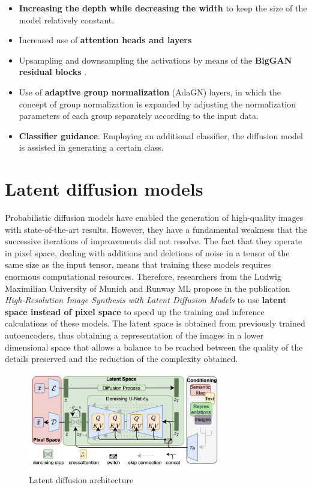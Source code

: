 \begin{itemize}
    \item \textbf{Increasing the depth while decreasing the width} to keep the size of the model relatively constant.
    \item Increased use of \textbf{attention heads and layers}
    \item Upsampling and downsampling the activations by means of the \textbf{BigGAN residual blocks} \cite{brock2018large}.
    \item Use of \textbf{adaptive group normalization} (AdaGN) layers, in which the concept of group normalization is expanded by adjusting the normalization parameters of each group separately according to the input data.
    \item \textbf{Classifier guidance}. Employing an additional classifier, the diffusion model is assisted in generating a certain class.
\end{itemize}

\section{Latent diffusion models} \label{Ldiffusion}

Probabilistic diffusion models have enabled the generation of high-quality images with state-of-the-art results. However, they have a fundamental weakness that the successive iterations of improvements did not resolve. The fact that they operate in pixel space, dealing with additions and deletions of noise in a tensor of the same size as the input tensor, means that training these models requires enormous computational resources. Therefore, researchers from the Ludwig Maximilian University of Munich and Runway ML propose in the publication \textit{High-Resolution Image Synthesis with Latent Diffusion Models} \cite{rombach2022high} to use \textbf{latent space instead of pixel space} to speed up the training and inference calculations of these models. The latent space is obtained from previously trained autoencoders, thus obtaining a representation of the images in a lower dimensional space that allows a balance to be reached between the quality of the details preserved and the reduction of the complexity obtained.

\begin{figure}
    \centering
    \includegraphics[width=0.75\textwidth]{Pictures/LDMDiagram.png} 
    \caption{Latent diffusion architecture \cite{rombach2022high}}
    \label{fig:LDMDiagram}
\end{figure}

